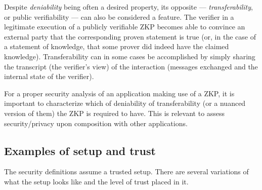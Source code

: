 Despite \emph{deniability} being often a desired property, its opposite --- \emph{transferability}, or public verifiability --- can also be considered a feature.
The verifier in a legitimate execution of a publicly verifiable ZKP becomes able to convince an external party that the corresponding proven statement is true (or, in the case of a statement of knowledge, that some prover did indeed have the claimed knowledge).
Transferability can in some cases be accomplished by simply sharing the transcript (the verifier's view) of the interaction (messages exchanged and the internal state of the verifier).


\begin{recommendation}
\label{rec:deniable-transferable}
For a proper security analysis of an application making use of a ZKP, it is important to characterize which of deniability of transferability (or a nuanced version of them) the ZKP is required to have. This is relevant to assess security/privacy upon composition with other applications.
\end{recommendation}



\subsection{Examples of setup and trust}
\label{sec:security:defs-props:examples-of-setup-and-trust}

The security definitions assume a trusted setup. There are several variations of what the setup looks like and the level of trust placed in it.

